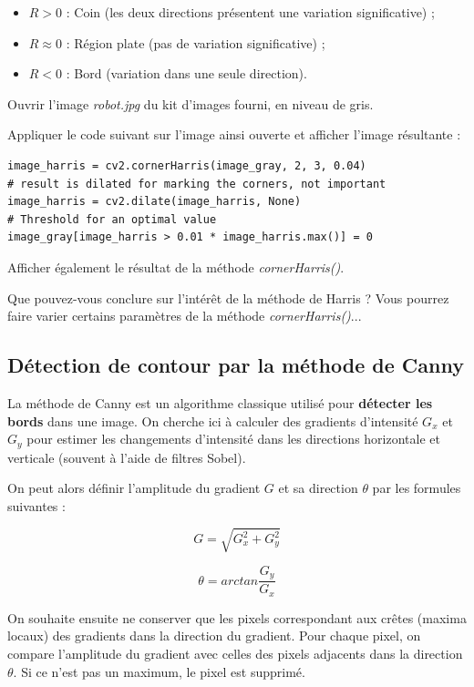 \documentclass[a4paper,11pt,titlepage]{article} %
\begin{document}
\begin{itemize}
	\item $R > 0$ : Coin (les deux directions présentent une variation significative) ;
	\item $R \approx 0$ : Région plate (pas de variation significative) ;
	\item $R < 0$ : Bord (variation dans une seule direction). 
\end{itemize}

\medskip

\Manip Ouvrir l'image \textsl{robot.jpg} du kit d'images fourni, en niveau de gris. 

\Manip Appliquer le code suivant sur l'image ainsi ouverte et afficher l'image résultante :

\begin{lstlisting}
image_harris = cv2.cornerHarris(image_gray, 2, 3, 0.04)
# result is dilated for marking the corners, not important
image_harris = cv2.dilate(image_harris, None)
# Threshold for an optimal value
image_gray[image_harris > 0.01 * image_harris.max()] = 0
\end{lstlisting}

\Manip Afficher également le résultat de la méthode \textsl{cornerHarris()}.

\Quest Que pouvez-vous conclure sur l'intérêt de la méthode de Harris ? Vous pourrez faire varier certains paramètres de la méthode \textsl{cornerHarris()}...


\subsection{Détection de contour par la méthode de Canny}

La méthode de Canny est un algorithme classique utilisé pour \textbf{détecter les bords} dans une image. On cherche ici à calculer des gradients d'intensité $G_x$ et $G_y$ pour estimer les changements d'intensité dans les directions horizontale et verticale (souvent à l'aide de filtres Sobel).

On peut alors définir l'amplitude du gradient $G$ et sa direction $\theta$ par les formules suivantes : 

$$G = \sqrt{G_x^2 + G_y^2}$$

$$\theta = arctan \frac{G_y}{G_x}$$

 
On souhaite ensuite ne conserver que les pixels correspondant aux crêtes (maxima locaux) des gradients dans la direction du gradient. Pour chaque pixel, on compare l'amplitude du gradient avec celles des pixels adjacents dans la direction $\theta$. Si ce n'est pas un maximum, le pixel est supprimé.
\end{document}
